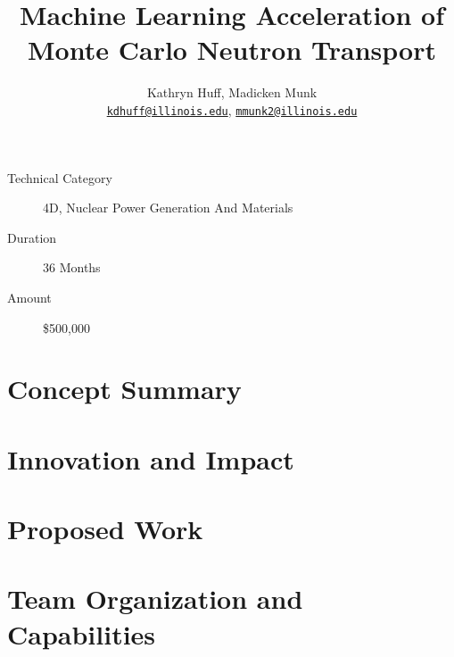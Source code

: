 \documentclass[letterpaper,12pt]{article}
\author{Kathryn Huff, Madicken Munk\\
        \href{mailto:kdhuff@illinois.edu}{\texttt{kdhuff@illinois.edu}},
        \href{mailto:mmunk2@illinois.edu}{\texttt{mmunk2@illinois.edu}}
}
\date{}
\title{Machine Learning Acceleration of Monte Carlo Neutron Transport}
\begin{document}
\thispagestyle{fancy}
\maketitle


\begin{description}
    \item[Technical Category] 4D, Nuclear Power Generation And Materials
    \item[Duration] 36 Months
    \item[Amount] \$500,000
\end{description}
\section{Concept Summary}
\section{Innovation and Impact}
\section{Proposed Work}
\section{Team Organization and Capabilities}
\nocite{*}
\pagebreak


\end{document}
